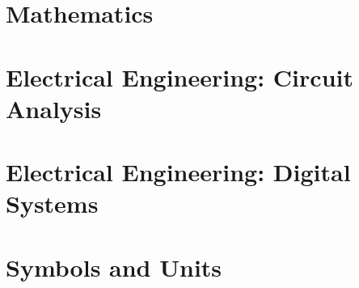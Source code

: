 \documentclass{article}
\newcommand{\LoadCheatsheet}[1]{{}}
\begin{document}
\thispagestyle{plain}
\MakeCustomTitle
\bigskip


\begin{center}%
    \parbox{0.7\textwidth}{\doclicenseThis}%
\end{center}

{
    \hypersetup{linkcolor=black}
    \tableofcontents
}

\newpage
{}

\section{Mathematics}

\LoadCheatsheet{07-differential-equations}

\newpage
\section{Electrical Engineering: Circuit Analysis}
\label{sec:ee-circuit-analysis}

    \LoadCheatsheet{electrical-engineering-circuit-analysis/1-dc-analysis}
    \newpage
    \LoadCheatsheet{electrical-engineering-circuit-analysis/2a-intro}
    \newpage
    \LoadCheatsheet{electrical-engineering-circuit-analysis/2b-magnetically-coupled-circuits}
    \newpage
    \LoadCheatsheet{electrical-engineering-circuit-analysis/2c-power}
    \newpage
    \LoadCheatsheet{electrical-engineering-circuit-analysis/3a-op-amps}
    \newpage
    \LoadCheatsheet{electrical-engineering-circuit-analysis/3b-semiconductors}
    \newpage
    \LoadCheatsheet{electrical-engineering-circuit-analysis/3c-feedback}
    \newpage
    \LoadCheatsheet{electrical-engineering-circuit-analysis/4a-non-linear-circuits}
    \newpage
    \LoadCheatsheet{electrical-engineering-circuit-analysis/5a-common-configs-transistor-amplifiers}

\newpage
\section{Electrical Engineering: Digital Systems}
\label{sec:ee-digital}

    \LoadCheatsheet{electrical-engineering-digital-systems/1-basics}
    \newpage
    \LoadCheatsheet{electrical-engineering-digital-systems/2-digital-analogue-interfacing}

\newpage
\section{Symbols and Units}
\label{sec:units}
\end{document}
